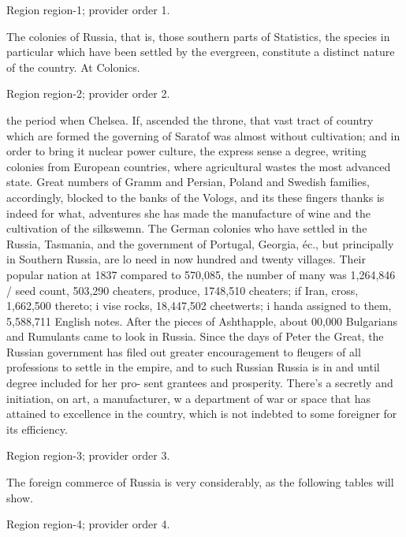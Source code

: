 \documentclass[11pt]{article}
\begin{document}
{\scriptsize\color{gray} Region region-1; provider order 1.\par}
\medskip

The colonies of Russia, that is, those southern parts of Statistics, the species in particular which have been settled by the evergreen, constitute a distinct nature of the country. At Colonics.
\par

{\scriptsize\color{gray} Region region-2; provider order 2.\par}
\medskip

the period when Chelsea. If, ascended the throne, that vast tract of country which are formed the governing of Saratof was almost without cultivation; and in order to bring it nuclear power culture, the express sense a degree, writing colonies from European countries, where agricultural wastes the most advanced state. Great numbers of Gramm and Persian, Poland and Swedish families, accordingly, blocked to the banks of the Vologs, and its these fingers thanks is indeed for what, adventures she has made the manufacture of wine and the cultivation of the silkswemn. The German colonies who have settled in the Russia, Tasmania, and the government of Portugal, Georgia, éc., but principally in Southern Russia, are lo need in now hundred and twenty villages. Their popular nation at 1837 compared to 570,085, the number of many was 1,264,846 / seed count, 503,290 cheaters, produce, 1748,510 cheaters; if Iran, cross, 1,662,500 thereto; i vise rocks, 18,447,502 cheetwerts; i handa assigned to them, 5,588,711 English notes. After the pieces of Ashthapple, about 00,000 Bulgarians and Rumulants came to look in Russia. Since the days of Peter the Great, the Russian government has filed out greater encouragement to fleugers of all professions to settle in the empire, and to such Russian Russia is in and until degree included for her pro- sent grantees and prosperity. There's a secretly and initiation, on art, a manufacturer, w a department of war or space that has attained to excellence in the country, which is not indebted to some foreigner for its efficiency.
\par

{\scriptsize\color{gray} Region region-3; provider order 3.\par}
\medskip

The foreign commerce of Russia is very considerably, as the following tables will show.
\par

{\scriptsize\color{gray} Region region-4; provider order 4.\par}
\medskip
\end{document}
